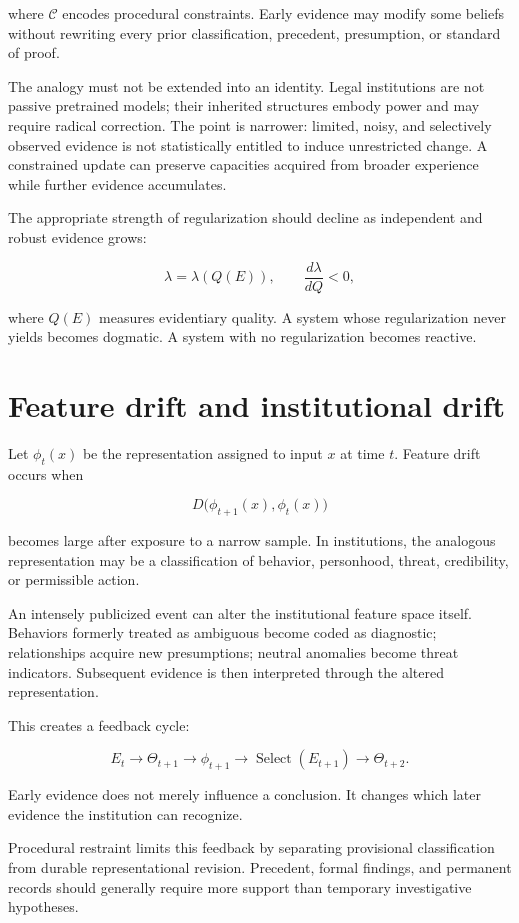 where \(\mathcal C\) encodes procedural constraints. Early evidence may modify some beliefs without rewriting every prior classification, precedent, presumption, or standard of proof.

The analogy must not be extended into an identity. Legal institutions are not passive pretrained models; their inherited structures embody power and may require radical correction. The point is narrower: limited, noisy, and selectively observed evidence is not statistically entitled to induce unrestricted change. A constrained update can preserve capacities acquired from broader experience while further evidence accumulates.

The appropriate strength of regularization should decline as independent and robust evidence grows:

\[
\lambda=\lambda(Q(E)),
\qquad
\frac{d\lambda}{dQ}<0,
\]

where \(Q(E)\) measures evidentiary quality. A system whose regularization never yields becomes dogmatic. A system with no regularization becomes reactive.

\section{Feature drift and institutional drift}
\label{sec:a46}

Let \(\phi_t(x)\) be the representation assigned to input \(x\) at time \(t\). Feature drift occurs when

\[
D\bigl(\phi_{t+1}(x),\phi_t(x)\bigr)
\]

becomes large after exposure to a narrow sample. In institutions, the analogous representation may be a classification of behavior, personhood, threat, credibility, or permissible action.

An intensely publicized event can alter the institutional feature space itself. Behaviors formerly treated as ambiguous become coded as diagnostic; relationships acquire new presumptions; neutral anomalies become threat indicators. Subsequent evidence is then interpreted through the altered representation.

This creates a feedback cycle:

\[
E_t
\to
\Theta_{t+1}
\to
\phi_{t+1}
\to
\operatorname{Select}(E_{t+1})
\to
\Theta_{t+2}.
\]

Early evidence does not merely influence a conclusion. It changes which later evidence the institution can recognize.

Procedural restraint limits this feedback by separating provisional classification from durable representational revision. Precedent, formal findings, and permanent records should generally require more support than temporary investigative hypotheses.

